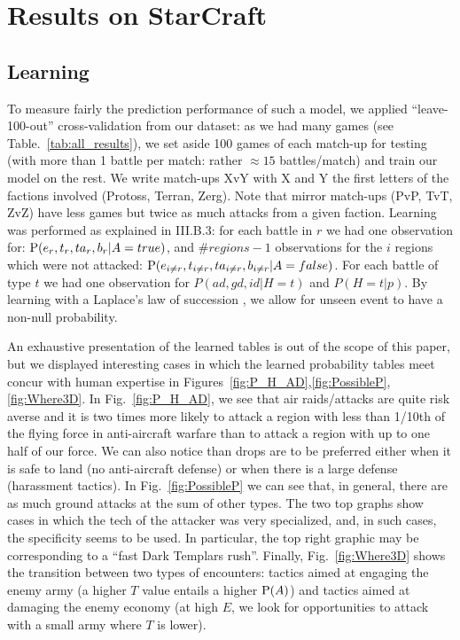 \section{Results on StarCraft}

\subsection{Learning}
To measure fairly the prediction performance of such a model, we applied ``leave-100-out'' cross-validation from our dataset: as we had many games (see Table.~\ref{tab:all_results}), we set aside 100 games of each match-up for testing (with more than 1 battle per match: rather $\approx 15$ battles/match) and train our model on the rest. We write match-ups XvY with X and Y the first letters of the factions involved (Protoss, Terran, Zerg). Note that mirror match-ups (PvP, TvT, ZvZ) have less games but twice as much attacks from a given faction. Learning was performed as explained in III.B.3: for each battle in $r$ we had one observation for: $\mathrm{P}(e_r,t_r,ta_r,b_r|A=true)$, and $\#regions-1$ observations for the $i$ regions which were not attacked: $\mathrm{P}(e_{i \neq r},t_{i \neq r}, ta_{i \neq r}, b_{i \neq r}|A=false)$. For each battle of type $t$ we had one observation for $P(ad,gd,id|H=t)$ and $P(H=t|p)$. By learning with a Laplace's law of succession \cite{Jaynes}, we allow for unseen event to have a non-null probability.

An exhaustive presentation of the learned tables is out of the scope of this paper, but we displayed interesting cases in which the learned probability tables meet concur with human expertise in Figures~\ref{fig:P_H_AD},\ref{fig:PossibleP},\ref{fig:Where3D}. In Fig.~\ref{fig:P_H_AD}, we see that air raids/attacks are quite risk averse and it is two times more likely to attack a region with less than 1/10th of the flying force in anti-aircraft warfare than to attack a region with up to one half of our force. We can also notice than drops are to be preferred either when it is safe to land (no anti-aircraft defense) or when there is a large defense (harassment tactics). In Fig.~\ref{fig:PossibleP} we can see that, in general, there are as much ground attacks at the sum of other types. The two top graphs show cases in which the tech of the attacker was very specialized, and, in such cases, the specificity seems to be used. In particular, the top right graphic may be corresponding to a ``fast Dark Templars rush''. Finally, Fig.~\ref{fig:Where3D} shows the transition between two types of encounters: tactics aimed at engaging the enemy army (a higher $T$ value entails a higher $\mathrm{P}(A)$) and tactics aimed at damaging the enemy economy (at high $E$, we look for opportunities to attack with a small army where $T$ is lower).

